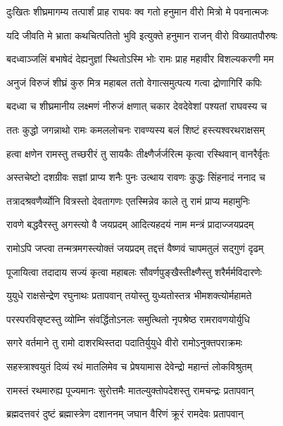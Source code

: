\twolineshloka
{दुःखितः शीघ्रमागम्य तत्पार्शं प्राह राघवः}
{क्व गतो हनुमान वीरो मित्रो मे पवनात्मजः} %

\twolineshloka
{यदि जीवति मे भ्राता कथचित्पतितो भुवि}
{इत्युक्ते हनुमान राजन् वीरो विख्यातपौरुषः} %

\twolineshloka
{बदध्वाञ्जलिं बभाषेदं देह्यनुज्ञां स्थितोऽस्मि भोः}
{रामः प्राह महावीर विशल्यकरणी मम} %

\twolineshloka
{अनुजं विरुजं शीघ्रं कुरु मित्र महाबल}
{ततो वेगात्समुत्पत्य गत्वा द्रोणागिरिं कपिः} %

\twolineshloka
{बदध्वा च शीघ्रमानीय लक्ष्मणं नीरुजं क्षणात्}
{चकार देवदेवेशां पश्यतां राघवस्य च} %

\twolineshloka
{ततः कुद्धो जगन्नाथो रामः कमललोचनः}
{रावण्यस्य बलं शिष्टं हस्त्यश्वरथराक्षसम्} %

\twolineshloka
{हत्वा क्षणेन रामस्तु तच्छरीरं तु सायकैः}
{तीक्ष्णैर्जर्जरित्म कृत्वा रस्थिवान् वानरैर्वृतः} %

\twolineshloka
{अस्तचेष्टो दशग्रीवः सज्ञां प्राप्य शनैः पुनः}
{उत्थाय रावणः कुद्धः सिंहनादं ननाद च} %

\twolineshloka
{तत्रादश्रवणैर्व्योनि वित्रस्तो देवतागणः}
{एतस्मिन्नेव काले तु रामं प्राप्य महामुनिः} %

\twolineshloka
{रावणे बद्धवैरस्तु अगस्त्यो वै जयप्रदम्}
{आदित्यहदयं नाम मन्त्रं प्रादाज्जयप्रदम्} %

\twolineshloka
{रामोऽपि जप्त्वा तन्मत्रमगस्त्योक्तं जयप्रदम्}
{तद्दत्तं वैष्णवं चापमतुलं सद्गुणं दृढम्} %

\twolineshloka
{पूजायित्वा तदादाय सज्यं कृत्वा महाबलः}
{सौवर्णपुङ्खैस्तीक्ष्णैस्तु शरैर्मर्मविदारणेः} %

\twolineshloka
{युयुधे राक्षसेन्द्रेण रघुनाथः प्रतापवान्}
{तयोस्तु युध्यतोस्तत्र भीमशक्त्योर्महामते} %

\twolineshloka
{परस्परविसृष्टस्तु व्योम्नि संवर्द्धितोऽनलः}
{समुत्थितो नृपश्रेष्ठ रामरावणयोर्युधि} %

\twolineshloka
{सगरे वर्तमाने तु रामो दाशरथिस्तदा}
{पदातिर्युयुधे वीरो रामोऽनुक्तपराक्रमः} %

\twolineshloka
{सहस्त्राश्वयुतं दिव्यं रथं मातलिमेव च}
{प्रेषयामास देवेन्द्रो महान्तं लोकविश्रुतम्} %

\twolineshloka
{रामस्तं रथमारुह्य पूज्यमानः सुरोत्तमैः}
{मातल्युक्तोपदेशस्तु रामचन्द्रः प्रतापवान्} %

\twolineshloka
{ब्रह्मदत्तवरं दुष्टं ब्रह्मास्त्रेण दशाननम्}
{जघान वैरिणं क्रूरं रामदेवः प्रतापवान्} %

